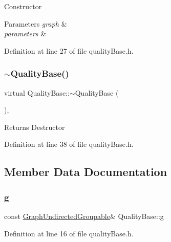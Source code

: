 Constructor 
\begin{DoxyParams}{Parameters}
{\em graph} & \\
\hline
{\em parameters} & \\
\hline
\end{DoxyParams}


Definition at line 27 of file quality\+Base.\+h.

\mbox{\label{classQualityBase_a28a1db64a80d984a07fec631714c3e6f}} 
\subsubsection{\texorpdfstring{$\sim$\+Quality\+Base()}{~QualityBase()}}
{\footnotesize\ttfamily virtual Quality\+Base\+::$\sim$\+Quality\+Base (\begin{DoxyParamCaption}{ }\end{DoxyParamCaption})\hspace{0.3cm}{\ttfamily [inline]}, {\ttfamily [virtual]}}

\begin{DoxyReturn}{Returns}
Destructor 
\end{DoxyReturn}


Definition at line 38 of file quality\+Base.\+h.



\subsection{Member Data Documentation}
\mbox{\label{classQualityBase_a0de27470f02f01671fcb17543f235758}} 
\subsubsection{\texorpdfstring{g}{g}}
{\footnotesize\ttfamily const \hyperlink{classGraphUndirectedGroupable}{Graph\+Undirected\+Groupable}\& Quality\+Base\+::g\hspace{0.3cm}{\ttfamily [protected]}}



Definition at line 16 of file quality\+Base.\+h.



